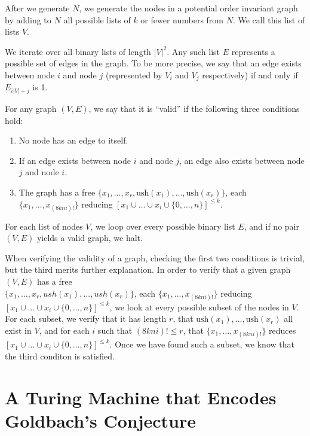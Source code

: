 \documentclass[11pt]{article}
\begin{document}
After we generate $N$, we generate the nodes in a potential order invariant graph by adding to $N$ all possible lists of $k$ or fewer numbers from $N$. We call this list of lists $V$. 

We iterate over all binary lists of length $|V|^2$. Any such list $E$ represents a possible set of edges in the graph. To be more precise, we say that an edge exists between node $i$ and node $j$ (represented by $V_i$ and $V_j$ respectively) if and only if $E_{i|V| + j}$ is 1. 

For any graph $(V, E)$, we say that it is ``valid'' if the following three conditions hold:

\begin{enumerate}

\item No node has an edge to itself.
\item If an edge exists between node $i$ and node $j$, an edge also exists between node $j$ and node $i$.
\item The graph has a free $\{x_1,\dots,x_r, \textrm{ush}(x_1),...,\textrm{ush}(x_r)\}$, each  $\{x_1, \dots, x_{(8kni)!}\}$ reducing $[x_1 \cup \dots \cup x_i \cup \{0,\dots,n\}]^{\le k}$.

\end{enumerate}

For each list of nodes $V$, we loop over every possible binary list $E$, and if no pair $(V, E)$ yields a valid graph, we halt. 

When verifying the validity of a graph, checking the first two conditions is trivial, but the third merits further explanation. In order to verify that a given graph $(V, E)$ has a free \\ $\{x_1,\dots,x_r, ush(x_1),...,ush(x_r)\}$, each  $\{x_1, \dots, x_{(8kni)!}\}$ reducing $[x_1 \cup \dots \cup x_i \cup \{0,\dots,n\}]^{\le k}$, we look at every possible subset of the nodes in $V$. For each subset, we verify that it has length $r$, that $\textrm{ush}(x_1),...,\textrm{ush}(x_r)$ all exist in $V$, and for each $i$ such that $(8kni)! \le r$, that $\{x_1, \dots, x_{(8kni)!}\}$ reduces $[x_1 \cup \dots \cup x_i \cup \{0,\dots,n\}]^{\le k}$. Once we have found such a subset, we know that the third conditon is satisfied.

\section{A Turing Machine that Encodes Goldbach's Conjecture}
\end{document}
